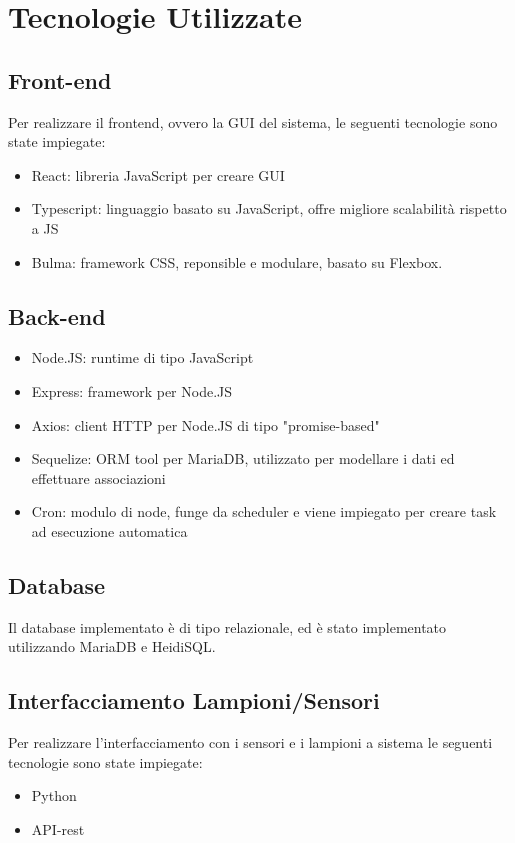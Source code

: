 \documentclass[12pt]{article}
\begin{document}
\section{Tecnologie Utilizzate}
\subsection{Front-end}
Per realizzare il frontend, ovvero la GUI del sistema, le seguenti tecnologie sono state impiegate:
\begin{itemize}
	\item React: libreria JavaScript per creare GUI
	\item Typescript: linguaggio basato su JavaScript, offre migliore scalabilità rispetto a JS
	\item Bulma: framework CSS, reponsible e modulare, basato su Flexbox.
\end{itemize}

\subsection{Back-end}
\begin{itemize}
	\item Node.JS: runtime di tipo JavaScript
	\item Express: framework per Node.JS
	\item Axios: client HTTP per Node.JS di tipo "promise-based"
	\item Sequelize: ORM tool per MariaDB, utilizzato per modellare i dati ed effettuare associazioni
	\item Cron: modulo di node, funge da scheduler e viene impiegato per creare task ad esecuzione automatica
\end{itemize}

\subsection{Database}
Il database implementato è di tipo relazionale, ed è stato implementato utilizzando MariaDB e HeidiSQL.
\subsection{Interfacciamento Lampioni/Sensori}
Per realizzare l'interfacciamento con i sensori e i lampioni a sistema le seguenti tecnologie sono state impiegate:
\begin{itemize}
	\item Python
	\item API-rest 
\end{itemize}
\end{document}
